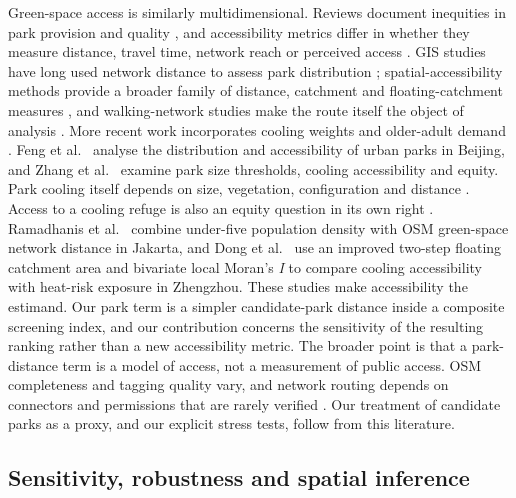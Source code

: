 \documentclass[times,twoside]{_Templates/MultiTargetManuscript}
\begin{document}
Green-space access is similarly multidimensional. Reviews document inequities
in park provision and quality \citep{wolch2014,rigolon2016}, and accessibility
metrics differ in whether they measure distance, travel time, network reach or
perceived access \citep{ekkel2017}. GIS studies have long used network distance
to assess park distribution \citep{oh2007}; spatial-accessibility methods provide
a broader family of distance, catchment and floating-catchment measures
\citep{luo2003,luo2009}, and walking-network studies make the route itself the
object of analysis \citep{stoia2022}. More recent work incorporates cooling
weights and older-adult demand \citep{kim2026}. Feng et al.\
\citep{feng2019} analyse the distribution and accessibility of urban parks in
Beijing, and Zhang et al.\ \citep{zhang2024} examine park size thresholds,
cooling accessibility and equity. Park cooling itself depends on size,
vegetation, configuration and distance \citep{bowler2010,aram2019,masoudi2019,algretawee2022}.
Access to a cooling refuge is also an equity question in its own right
\citep{voelkel2018,amorim2023}. Ramadhanis et al.\ \citep{ramadhanis2026}
combine under-five population density with OSM green-space network distance in
Jakarta, and Dong et al.\ \citep{dong2024} use an improved two-step floating
catchment area and bivariate local Moran's \textit{I} to compare cooling
accessibility with heat-risk exposure in Zhengzhou. These studies make
accessibility the estimand. Our park term is a simpler candidate-park distance
inside a composite screening index, and our contribution concerns the
sensitivity of the resulting ranking rather than a new accessibility metric. The
broader point is that a park-distance term is a model of access, not a
measurement of public access.
OSM completeness and tagging quality vary, and network routing depends on
connectors and permissions that are rarely verified \citep{haklay2010,barron2014,herfort2023}.
Our treatment of candidate parks as a proxy, and our explicit stress tests, follow
from this literature.

\subsection{Sensitivity, robustness and spatial inference}
\end{document}
